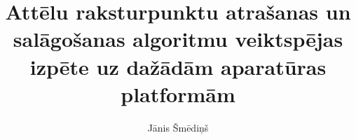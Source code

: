 \documentclass[magjistrs]{vea-diplomdarbs}
\title{Attēlu raksturpunktu atrašanas un salāgošanas algoritmu veiktspējas
       izpēte uz dažādām aparatūras platformām}
\author{Jānis Šmēdiņš}
\begin{document}
	\maketitle
	\onehalfspacing %
	\tableofcontents\clearpage
	\sloppy %
	
	
	
	
	
	
	\clearpage %
	\clearpage
	
	
	
	
	\clearpage
	
\end{document}
